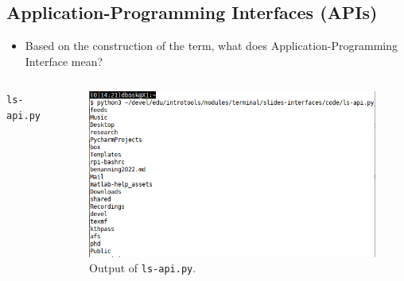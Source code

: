 \subsection{Application-Programming Interfaces (APIs)}

\begin{frame}
  \begin{exercise}
    \begin{itemize}
      \item Based on the construction of the term, what does 
        Application-Programming Interface mean?
    \end{itemize}
  \end{exercise}
\end{frame}

\begin{frame}
  \begin{columns}
    \begin{column}{0.5\columnwidth}
      \begin{block}{\texttt{ls-api.py}}
        \inputminted[fontsize=\tiny,linenos,highlightlines={1,4}]{python}{code/ls-api.py}
      \end{block}
    \end{column}
    \begin{column}{0.5\columnwidth}
      \begin{figure}
        \includegraphics[width=\columnwidth]{fig/ls-api-out.png}
        \caption{Output of \texttt{ls-api.py}.}
      \end{figure}
    \end{column}
  \end{columns}
\end{frame}

